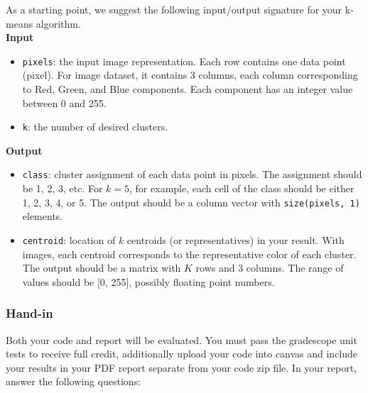 \documentclass[twoside,10pt]{article}
\begin{document}
As a starting point, we suggest the following input/output signature for your k-means algorithm.\\

\textbf{Input}
\begin{itemize}
  \item \texttt{pixels}: the input image representation. Each row contains one data point (pixel). For image dataset, it contains 3 columns, each column corresponding to Red, Green, and Blue components. Each component has an integer value between 0 and 255.
  \item \texttt{k}: the number of desired clusters.
\end{itemize}

\textbf{Output}
\begin{itemize}
  \item \texttt{class}: cluster assignment of each data point in pixels. The assignment should be 1, 2, 3, etc. For $k = 5$, for example, each cell of the class should be either 1, 2, 3, 4, or 5. The output should be a column vector with \texttt{size(pixels, 1)} elements.
  \item \texttt{centroid}: location of $k$ centroids (or representatives) in your result. With images, each centroid corresponds to the representative color of each cluster. The output should be a matrix with $K$ rows and 3 columns. The range of values should be [0, 255], possibly floating point numbers.
\end{itemize}

\subsubsection*{Hand-in}
Both your code and report will be evaluated. You must pass the gradescope unit tests to receive full credit, additionally upload your code into canvas and include your results in your PDF report separate from your code zip file. In your report, answer the following questions:
\end{document}
